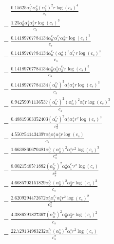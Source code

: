 \documentclass[10pt]{article}
\begin{document}
\begin{align*}
&{}  - \frac{0.15625 \alpha_{0}^{c_s} \alpha_{0}^s \left(\alpha_{1}^s\right)^{2} r \log{\left(c_{s} \right)}^{4}}{c_{s}} \\
&{}  - \frac{1.25 \alpha_{0}^s \alpha_{1}^s \alpha_{2}^s r \log{\left(c_{s} \right)}^{3}}{c_{s}} \\
&{}  - \frac{0.14189767784134 \alpha_{0}^{c_s} \alpha_{1}^{c_s} \alpha_{2}^s r \log{\left(c_{s} \right)}^{3}}{c_{s}} \\
&{}  - \frac{0.14189767784134 \alpha_{0}^{c_s} \left(\alpha_{0}^s\right)^{3} \alpha_{1}^{c_s} r \log{\left(c_{s} \right)}^{3}}{c_{s}} \\
&{}  - \frac{0.14189767784134 \alpha_{0}^s \alpha_{1}^s \alpha_{2}^{c_s} r \log{\left(c_{s} \right)}^{3}}{c_{s}} \\
&{}  - \frac{0.14189767784134 \left(\alpha_{0}^{c_s}\right)^{3} \alpha_{0}^s \alpha_{1}^s r \log{\left(c_{s} \right)}^{3}}{c_{s}} \\
&{}  - \frac{0.94259071136537 \left(\alpha_{0}^{c_s}\right)^{2} \left(\alpha_{0}^s\right)^{2} \alpha_{1}^s r \log{\left(c_{s} \right)}^{3}}{c_{s}} \\
&{}  - \frac{0.48819303352403 \left(\alpha_{0}^{c_s}\right)^{2} \alpha_{0}^s \alpha_{1}^s r^{2} \log{\left(c_{s} \right)}^{3}}{c_{s}^{2}} \\
&{}  - \frac{4.5507541434397 \alpha_{0}^s \alpha_{1}^s \alpha_{2}^s r \log{\left(c_{s} \right)}}{c_{s}} \\
&{}  - \frac{1.6638860670481 \alpha_{0}^{c_s} \left(\alpha_{0}^s\right)^{2} \alpha_{1}^s r^{2} \log{\left(c_{s} \right)}^{3}}{c_{s}^{2}} \\
&{}  - \frac{8.0021548571882 \left(\alpha_{0}^{c_s}\right)^{2} \alpha_{0}^s \alpha_{1}^{c_s} r^{2} \log{\left(c_{s} \right)}}{c_{s}^{2}} \\
&{}  - \frac{4.6685703151829 \alpha_{0}^{c_s} \left(\alpha_{0}^s\right)^{2} \alpha_{2}^s r \log{\left(c_{s} \right)}^{2}}{c_{s}} \\
&{}  - \frac{2.6209294472672 \alpha_{0}^s \alpha_{1}^{c_s} \alpha_{1}^s r^{2} \log{\left(c_{s} \right)}^{2}}{c_{s}^{2}} \\
&{}  - \frac{4.3886291827367 \left(\alpha_{0}^{c_s}\right)^{2} \alpha_{0}^s \alpha_{2}^s r \log{\left(c_{s} \right)}^{2}}{c_{s}} \\
&{}  - \frac{22.729134983232 \alpha_{0}^{c_s} \left(\alpha_{0}^s\right)^{2} \alpha_{1}^s r^{2} \log{\left(c_{s} \right)}}{c_{s}^{2}}
\end{align*}
\end{document}
